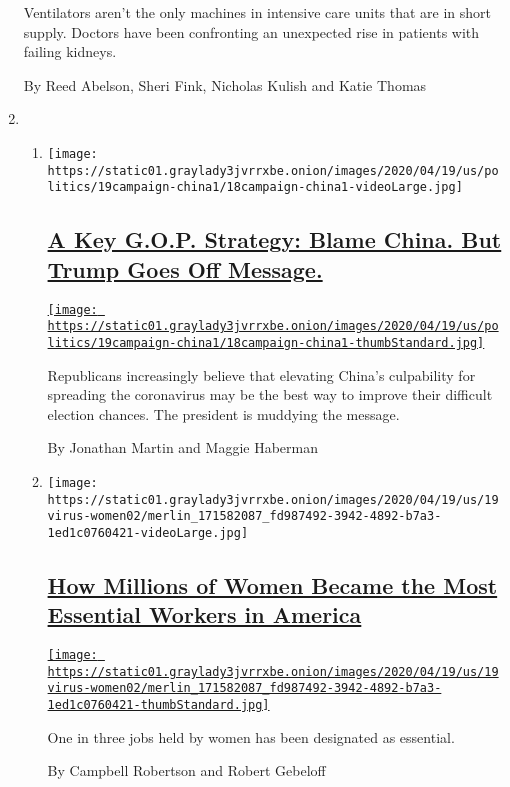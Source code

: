 \begin{enumerate}
  Ventilators aren't the only machines in intensive care units that are
  in short supply. Doctors have been confronting an unexpected rise in
  patients with failing kidneys.

  By Reed Abelson, Sheri Fink, Nicholas Kulish and Katie Thomas
\item
  \begin{enumerate}
  \def\labelenumii{\arabic{enumii}.}
  \item
    \texttt{[image: https://static01.graylady3jvrrxbe.onion/images/2020/04/19/us/politics/19campaign-china1/18campaign-china1-videoLarge.jpg]}

    \hypertarget{a-key-gop-strategy-blame-china-but-trump-goes-off-message}{%
    \subsection{\texorpdfstring{\href{/2020/04/18/us/politics/trump-china-virus.html}{A
    Key G.O.P. Strategy: Blame China. But Trump Goes Off
    Message.}}{A Key G.O.P. Strategy: Blame China. But Trump Goes Off Message.}}\label{a-key-gop-strategy-blame-china-but-trump-goes-off-message}}

    \href{/2020/04/18/us/politics/trump-china-virus.html}{\texttt{[image: https://static01.graylady3jvrrxbe.onion/images/2020/04/19/us/politics/19campaign-china1/18campaign-china1-thumbStandard.jpg]}}

    Republicans increasingly believe that elevating China's culpability
    for spreading the coronavirus may be the best way to improve their
    difficult election chances. The president is muddying the message.

    By Jonathan Martin and Maggie Haberman
  \item
    \texttt{[image: https://static01.graylady3jvrrxbe.onion/images/2020/04/19/us/19virus-women02/merlin\_171582087\_fd987492-3942-4892-b7a3-1ed1c0760421-videoLarge.jpg]}

    \hypertarget{how-millions-of-women-became-the-most-essential-workers-in-america}{%
    \subsection{\texorpdfstring{\href{/2020/04/18/us/coronavirus-women-essential-workers.html}{How
    Millions of Women Became the Most Essential Workers in
    America}}{How Millions of Women Became the Most Essential Workers in America}}\label{how-millions-of-women-became-the-most-essential-workers-in-america}}

    \href{/2020/04/18/us/coronavirus-women-essential-workers.html}{\texttt{[image: https://static01.graylady3jvrrxbe.onion/images/2020/04/19/us/19virus-women02/merlin\_171582087\_fd987492-3942-4892-b7a3-1ed1c0760421-thumbStandard.jpg]}}

    One in three jobs held by women has been designated as essential.

    By Campbell Robertson and Robert Gebeloff
  \end{enumerate}
\end{enumerate}

